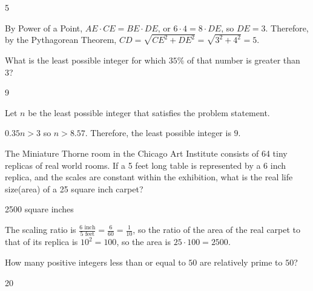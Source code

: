 \documentclass[11pt]{article}
\begin{document}
\begin{answer}
5
\end{answer}

\begin{solution}
By Power of a Point, $AE \cdot CE = BE \cdot DE$, or $6 \cdot 4 = 8 \cdot DE$, so $DE = 3$. Therefore, by the Pythagorean Theorem, $CD = \sqrt{CE^2 + DE^2} = \sqrt{3^2 + 4^2} = 5$.
\end{solution}


\begin{problem}
What is the least possible integer for which $35\%$ of that number is greater than 3?
\end{problem}

\begin{answer}
9
\end{answer}

\begin{solution}
Let $n$ be the least possible integer that satisfies the problem statement.

$0.35n > 3$ so $n > 8.57$. Therefore, the least possible integer is $9$.
\end{solution}


\begin{problem} %
The Miniature Thorne room in the Chicago Art Institute consists of 64 tiny replicas of real world rooms. If a 5 feet long table is represented by a 6 inch replica, and the scales are constant within the exhibition, what is the real life size(area) of a 25 square inch carpet?
\end{problem}

\begin{answer}
2500 square inches
\end{answer}

\begin{solution}
The scaling ratio is $\frac{6 \text{ inch}}{5 \text{ feet}} = \frac{6}{60} = \frac{1}{10}$, so the ratio of the area of the real carpet to that of its replica is $10^2 = 100$, so the area is $25 \cdot 100 = 2500$.
\end{solution}


\begin{problem}%
How many positive integers less than or equal to $50$ are relatively prime to $50$?
\end{problem}

\begin{answer}
20
\end{answer}
\end{document}
